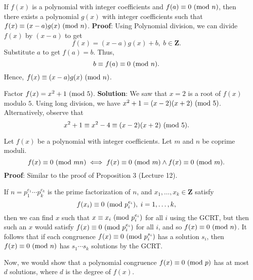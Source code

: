 \begin{Theorem}{}{}
    If $ f(x) $ is a polynomial with integer coefficients and $ f(a)\equiv 0\ (\mathrm{mod}\ n) $,
    then there exists a polynomial $ g(x) $ with integer coefficients such that $ f(x)\equiv (x-a)g(x)\ (\mathrm{mod}\ n) $.
    \tcblower{}
    \textbf{Proof}: Using Polynomial division, we can divide $ f(x) $ by $ (x-a) $
    to get
    \[ f(x)=(x-a)g(x)+b,\; b\in\mathbf{Z}. \]
    Substitute $ a $ to get $ f(a)=b $. Thus,
    \[ b\equiv f(a)\equiv 0\ (\mathrm{mod}\ n). \]
    Hence, $ f(x)\equiv (x-a)g(x)\ (\mathrm{mod}\ n) $.
\end{Theorem}
\begin{Example}{}{}
    Factor $ f(x)=x^2+1\ (\mathrm{mod}\ 5) $.
    \tcblower{}
    \textbf{Solution}:
    We saw that $ x=2 $ is a root of $ f(x) $ modulo $ 5 $. Using long division, we have
    $ x^2+1=(x-2)(x+2)\ (\mathrm{mod}\ 5) $. Alternatively, observe that
    \[ x^2+1\equiv x^2-4\equiv (x-2)(x+2)\ (\mathrm{mod}\ 5). \]
\end{Example}
\begin{Proposition}{}{}
    Let $ f(x) $ be a polynomial with integer coefficients. Let $ m $ and $ n $
    be coprime moduli.
    \[ f(x)\equiv 0\ (\mathrm{mod}\ mn)\iff f(x)\equiv 0\ (\mathrm{mod}\ m)\land f(x)\equiv 0\ (\mathrm{mod}\ m). \]
    \tcblower{}
    \textbf{Proof}: Similar to the proof of Proposition 3 (Lecture 12).
\end{Proposition}
If $ n=p_1^{e_1}\cdots p_k^{e_k} $ is the prime factorization of $ n $, and
$ x_1,\ldots,x_k\in\mathbf{Z} $ satisfy
\[ f(x_i)\equiv 0\ (\mathrm{mod}\ p_i^{e_i}),\; i=1,\ldots,k, \]
then we can find $ x $ such that $ x\equiv x_i\ (\mathrm{mod}\ p_i^{e_i}) $ for all $ i $ using
the GCRT, but then such an $ x $ would satisfy $ f(x)\equiv 0\ (\mathrm{mod}\ p_i^{e_i}) $ for all $ i $,
and so $ f(x)\equiv 0\ (\mathrm{mod}\ n) $. It follows that if each congruence
$ f(x)\equiv 0\ (\mathrm{mod}\ p_i^{s_i}) $ has a solution $ s_i $, then $ f(x)\equiv 0\ (\mathrm{mod}\ n) $
has $ s_1\cdots s_k $ solutions by the GCRT\@.

Now, we would show that a polynomial congruence $ f(x)\equiv 0\ (\mathrm{mod}\ p) $
has at most $ d $ solutions, where $ d $ is the degree of $ f(x) $.

